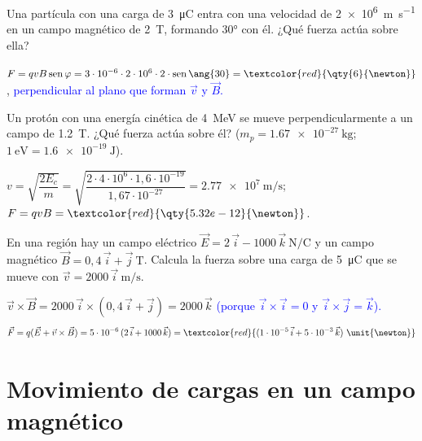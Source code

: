 \begin{exercise}
    Una partícula con una carga de \qty{3}{\micro\coulomb} entra con una velocidad de \qty{2e6}{\m\per\second} en un campo
    magnético de \qty{2}{\tesla}, formando \ang{30} con él. ¿Qué fuerza actúa sobre ella?
    \begin{solu}
        \(F = q v B\sen\varphi = 3\cdot 10^{-6}\cdot 2\cdot 10^6\cdot 2\cdot\sen\ang{30} = \textcolor{red}{\qty{6}{\newton}}\),
        \textcolor{blue}{perpendicular al plano que forman \(\vec v\) y \(\vec B\).}
    \end{solu}
\end{exercise}

\begin{exercise}
    Un protón con una energía cinética de \qty{4}{\mega\electronvolt} se mueve perpendicularmente a un campo de \qty{1.2}{\tesla}.
    ¿Qué fuerza actúa sobre él? (\(m_p = \qty{1.67e-27}{\kg}\); \(\qty{1}{\electronvolt} = \qty{1.6e-19}{\joule}\)).
    \begin{solu}
        \(v = \sqrt{\dfrac{2E_c}{m}} = \sqrt{\dfrac{2\cdot 4\cdot 10^6\cdot 1{,}6\cdot 10^{-19}}{1{,}67\cdot 10^{-27}}} = \qty{2.77e7}{\m\per\second}\);
        \(F = q v B = \textcolor{red}{\qty{5.32e-12}{\newton}}\).
    \end{solu}
\end{exercise}

\begin{exercise}
    En una región hay un campo eléctrico \(\vec E = 2\,\vec{i} - 1000\,\vec{k}\ \unit{\newton\per\coulomb}\) y un campo magnético
    \(\vec B = 0{,}4\,\vec{i} + \vec{j}\ \unit{\tesla}\). Calcula la fuerza sobre una carga de \qty{5}{\micro\coulomb} que se mueve
    con \(\vec v = 2000\,\vec{i}\ \unit{\m\per\second}\).
    \begin{solu}
        \(\vec v\times\vec B = 2000\,\vec{i}\times(0{,}4\,\vec{i} + \vec{j}) = 2000\,\vec{k}\) \textcolor{blue}{(porque \(\vec{i}\times\vec{i} = 0\) y \(\vec{i}\times\vec{j} = \vec{k}\)).}
        \[ \vec F = q(\vec E + \vec v\times\vec B) = 5\cdot 10^{-6}\,(2\,\vec{i} + 1000\,\vec{k}) = \textcolor{red}{(1\cdot 10^{-5}\,\vec{i} + 5\cdot 10^{-3}\,\vec{k})\ \unit{\newton}} \]
    \end{solu}
\end{exercise}

\section{Movimiento de cargas en un campo magnético}\label{sec:mag-movimiento}

